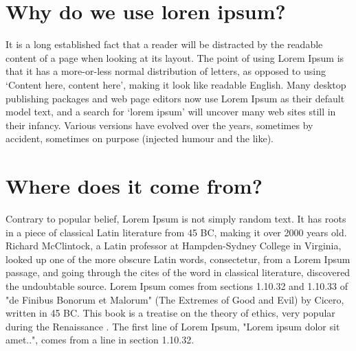 

\section{Why do we use loren ipsum?}\label{intro:why}

  It is a long established fact that a reader will be distracted by the readable content of a page when looking at its layout. The point of using Lorem Ipsum is that it has a more-or-less normal distribution of letters, as opposed to using `Content here, content here', making it look like readable English. Many desktop publishing packages and web page editors now use Lorem Ipsum as their default model text, and a search for `lorem ipsum' will uncover many web sites still in their infancy. Various versions have evolved over the years, sometimes by accident, sometimes on purpose (injected humour and the like).

\section{Where does it come from?}\label{intro:where} 

  Contrary to popular belief, Lorem Ipsum is not simply random text. It has roots in a piece of classical Latin literature from 45 BC, making it over 2000 years old. Richard McClintock, a Latin professor at Hampden-Sydney College in Virginia, looked up one of the more obscure Latin words, consectetur, from a Lorem Ipsum passage, and going through the cites of the word in classical literature, discovered the undoubtable source. Lorem Ipsum comes from sections 1.10.32 and 1.10.33 of "de Finibus Bonorum et Malorum" (The Extremes of Good and Evil) by Cicero, written in 45 BC. This book is a treatise on the theory of ethics, very popular during the Renaissance \cite{Abdulkadir2010,BENDIKSEN1984467,FALCONE20097,Fujita1990}. The first line of Lorem Ipsum, "Lorem ipsum dolor sit amet..", comes from a line in section 1.10.32.

